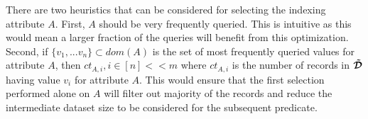 There are two heuristics that can be considered for selecting the indexing attribute $A$. First, $A$ should be very frequently queried. This is intuitive as this would mean a larger fraction of the queries will benefit from this optimization. Second, if $\{v_1,...v_n\} \subset dom(A)$ is the set of most frequently queried values for attribute $A$, then $ct_{A,i}, i \in [n] << m$ where $ct_{A,i}$ is the number of records in $\boldsymbol{\tilde{\mathcal{D}}}$ having value $v_i$ for attribute $A$. This would ensure that the first selection performed alone on $A$ will filter out majority of the records and reduce the intermediate dataset size to be considered for the subsequent predicate.


